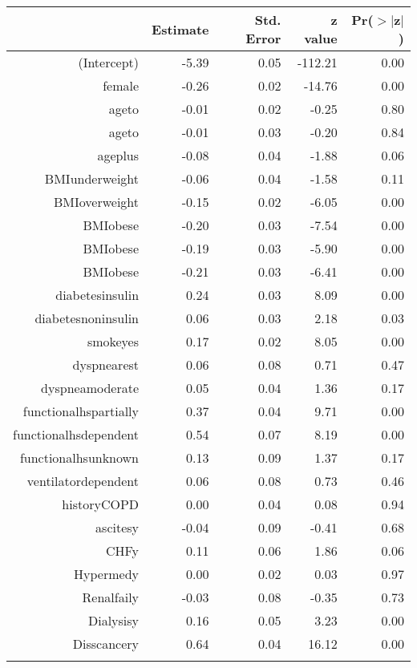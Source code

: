 \bigskip\bigskip
\centering
\begin{tabular}{rrrrr}
  \hline
 & Estimate & Std. Error & z value & Pr($>$$|$z$|$) \\ 
  \hline
(Intercept) & -5.39 & 0.05 & -112.21 & 0.00 \\ 
  female & -0.26 & 0.02 & -14.76 & 0.00 \\ 
  age\-65\-to\-74 & -0.01 & 0.02 & -0.25 & 0.80 \\ 
  age\-75\-to\-84 & -0.01 & 0.03 & -0.20 & 0.84 \\ 
  age\-85\-plus & -0.08 & 0.04 & -1.88 & 0.06 \\ 
  BMI\-underweight & -0.06 & 0.04 & -1.58 & 0.11 \\ 
  BMI\-overweight & -0.15 & 0.02 & -6.05 & 0.00 \\ 
  BMI\-obese\-1 & -0.20 & 0.03 & -7.54 & 0.00 \\ 
  BMI\-obese\-2 & -0.19 & 0.03 & -5.90 & 0.00 \\ 
  BMI\-obese\-3 & -0.21 & 0.03 & -6.41 & 0.00 \\ 
  diabetes\-insulin & 0.24 & 0.03 & 8.09 & 0.00 \\ 
  diabetes\-noninsulin & 0.06 & 0.03 & 2.18 & 0.03 \\ 
  smoke\-yes & 0.17 & 0.02 & 8.05 & 0.00 \\ 
  dyspnea\-rest & 0.06 & 0.08 & 0.71 & 0.47 \\ 
  dyspnea\-moderate & 0.05 & 0.04 & 1.36 & 0.17 \\ 
  functional\-hs\-partially & 0.37 & 0.04 & 9.71 & 0.00 \\ 
  functional\-hs\-dependent & 0.54 & 0.07 & 8.19 & 0.00 \\ 
  functional\-hs\-unknown & 0.13 & 0.09 & 1.37 & 0.17 \\ 
  ventilator\-dependent & 0.06 & 0.08 & 0.73 & 0.46 \\ 
  history\-COPD & 0.00 & 0.04 & 0.08 & 0.94 \\ 
  ascites\-y & -0.04 & 0.09 & -0.41 & 0.68 \\ 
  CHF\-y & 0.11 & 0.06 & 1.86 & 0.06 \\ 
  Hyper\-med\-y & 0.00 & 0.02 & 0.03 & 0.97 \\ 
  Renal\-fail\-y & -0.03 & 0.08 & -0.35 & 0.73 \\ 
  Dialysis\-y & 0.16 & 0.05 & 3.23 & 0.00 \\ 
  Diss\-cancer\-y & 0.64 & 0.04 & 16.12 & 0.00 \\ 
$$
\end{tabular}
